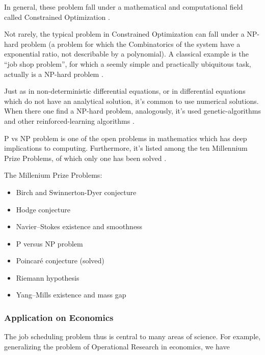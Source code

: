 \documentclass[
12pt,				%
openright,			%
oneside,			%
a4paper,			%
brazil,				%
english,			%
]{abntex2}
\begin{document}
In general, these problem fall under a mathematical and computational
field called Constrained Optimization \cite{bertsekas2014constrained}. 

Not rarely, the typical problem in Constrained Optimization can fall
under a NP-hard problem (a problem for which the Combinatorics of the
system have a exponential ratio, not describable by a polynomial). A
classical example is the ``job shop problem'', for which a seemly
simple and practically ubiquitous task, actually is a NP-hard problem \cite{zhang2019review}.   

Just as in non-deterministic differential equations, or in
differential equations which do not have an analytical solution, it's
common to use numerical solutions. When there one find a NP-hard
problem, analogously, it's used genetic-algorithms and other
reinforced-learning algorithms \cite{zhang2019review}.  

P vs NP problem is one of the open problems in mathematics which has
deep implications to computing. Furthermore, it's listed among the ten
Millennium Prize Problems, of which only one has been solved \cite{cook2006p}.

The Millenium Prize Problems:

\begin{itemize}
  \item Birch and Swinnerton-Dyer conjecture
  \item Hodge conjecture
  \item Navier–Stokes existence and smoothness
  \item P versus NP problem
  \item Poincaré conjecture (solved)
  \item Riemann hypothesis
  \item Yang–Mills existence and mass gap
\end{itemize}



\subsubsection{Application on Economics}

The job scheduling problem thus is central to many areas of
science. For example, generalizing the problem of Operational
Research in economics, we have
\end{document}
